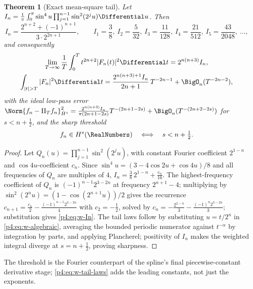 \documentclass[11pt,oneside]{article}
\numberwithin{equation}{section}
\newtheorem{theorem}{Theorem}[section]
\theoremstyle{definition}
\theoremstyle{remark}
\begin{document}
\begin{theorem}[Exact mean-square tail]
\label{p4:thm:w-meansquare}
Let
$I_n=\frac1\pi\int_0^\pi\sin^4u\prod_{j=1}^{n-1}\sin^2(2^ju)\Differential u$.  Then
\begin{equation}
 I_n=\frac{2^{n+2}+(-1)^{n+1}}{3\cdot2^{2n+1}},
 \qquad
 I_1=\frac38,\ I_2=\frac5{32},\ I_3=\frac{11}{128},\
 I_4=\frac{21}{512},\ I_5=\frac{43}{2048},\ \ldots,
 \label{p4:eq:w-In}
\end{equation}
and consequently
\begin{equation}
\begin{gathered}
 \lim_{T\to\infty}\frac1T\int_0^Tt^{2n+2}|F_n(t)|^2\Differential t
 =2^{n(n+3)}I_n,\\
 \int_{|t|>T}|F_n|^2\Differential t
 =\frac{2^{n(n+3)+1}I_n}{2n+1}\,T^{-2n-1}+\BigO_n(T^{-2n-2}),
\end{gathered}
 \label{p4:eq:w-tail-laws}
\end{equation}
with the ideal low-pass error
$\Norm{f_n-\Pi_Tf_n}_{\dot H^s}^2
=\frac{2^{n(n+3)}I_n}{\pi(2n+1-2s)}T^{-(2n+1-2s)}+\BigO_n(T^{-(2n+2-2s)})$
for $s<n+\tfrac12$, and the sharp threshold
\begin{equation}
 f_n\in H^s(\RealNumbers)\quad\Longleftrightarrow\quad s<n+\tfrac12.
 \label{p4:eq:w-Hs-threshold}
\end{equation}
\end{theorem}

\begin{proof}
Let $Q_n(u)=\prod_{j=1}^{n-1}\sin^2(2^ju)$, with constant Fourier
coefficient $2^{1-n}$ and $\cos4u$-coefficient $c_n$.  Since
$\sin^4u=(3-4\cos2u+\cos4u)/8$ and all frequencies of $Q_n$ are multiples
of $4$, $I_n=\tfrac38\,2^{1-n}+\tfrac{c_n}{16}$.  The highest-frequency
coefficient of $Q_n$ is $(-1)^{n-1}2^{3-2n}$ at frequency $2^{n+1}-4$;
multiplying by $\sin^2(2^nu)=(1-\cos(2^{n+1}u))/2$ gives the recurrence
$c_{n+1}=\tfrac{c_n}2-\tfrac{(-1)^{n-1}2^{3-2n}}4$ with $c_2=-\tfrac12$,
solved by $c_n=-\tfrac{2^{2-n}}3-\tfrac{(-1)^n2^{3-2n}}3$; substitution
gives \eqref{p4:eq:w-In}.  The tail laws follow by substituting $u=t/2^n$ in
\eqref{p4:eq:w-algebraic}, averaging the bounded periodic numerator against
$t^{-\alpha}$ by integration by parts, and applying Plancherel; positivity
of $I_n$ makes the weighted integral diverge at $s=n+\tfrac12$, proving
sharpness.
\end{proof}

The threshold is the Fourier counterpart of the spline's final
piecewise-constant derivative stage; \eqref{p4:eq:w-tail-laws} adds the leading
constants, not just the exponents.
\end{document}
